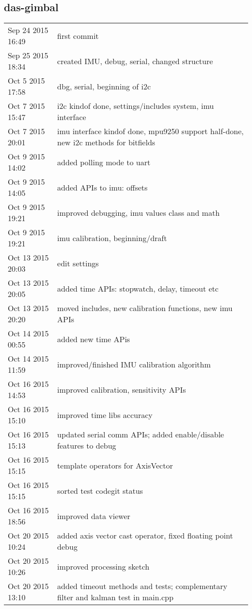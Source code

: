 \subsection{das-gimbal}

\begin{longtable}{ l || p{9.5cm}}
	\hline			
	Sep 24 2015 16:49	& first commit	\\
	Sep 25 2015 18:34	& created IMU, debug, serial, changed structure	\\
	Oct 5 2015 17:58	& dbg, serial, beginning of i2c	\\
	Oct 7 2015 15:47	& i2c kindof done, settings/includes system, imu interface	\\
	Oct 7 2015 20:01	& imu interface kindof done, mpu9250 support half-done, new i2c methods for bitfields	\\
	Oct 9 2015 14:02	& added polling mode to uart	\\
	Oct 9 2015 14:05	& added APIs to imu: offsets	\\
	Oct 9 2015 19:21	& improved debugging, imu values class and math	\\
	Oct 9 2015 19:21	& imu calibration, beginning/draft	\\
	Oct 13 2015 20:03	& edit settings	\\
	Oct 13 2015 20:05	& added time APIs: stopwatch, delay, timeout etc	\\
	Oct 13 2015 20:20	& moved includes, new calibration functions, new imu APIs	\\
	Oct 14 2015 00:55	& added new time APis	\\
	Oct 14 2015 11:59	& improved/finished IMU calibration algorithm	\\
	Oct 16 2015 14:53	& improved calibration, sensitivity APIs	\\
	Oct 16 2015 15:10	& improved time libs accuracy	\\
	Oct 16 2015 15:13	& updated serial comm APIs; added enable/disable features to debug	\\
	Oct 16 2015 15:15	& template operators for AxisVector	\\
	Oct 16 2015 15:15	& sorted test codegit status	\\
	Oct 16 2015 18:56	& improved data viewer	\\
	Oct 20 2015 10:24	& added axis vector cast operator, fixed floating point debug	\\
	Oct 20 2015 10:26	& improved processing sketch	\\
	Oct 20 2015 13:10	& added timeout methods and tests; complementary filter and kalman test in main.cpp	\\

\end{longtable}
